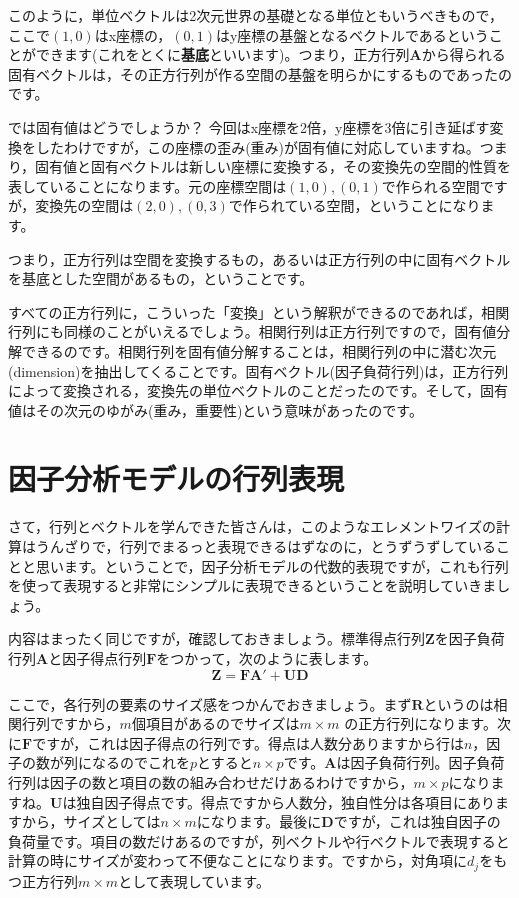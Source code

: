 \documentclass{ltjsbook}
\begin{document}
このように，単位ベクトルは2次元世界の基礎となる単位ともいうべきもので，ここで$(1,0)$はx座標の，$(0,1)$はy座標の基盤となるベクトルであるということができます(これをとくに\textbf{基底}といいます)。つまり，正方行列$\bm{A}$から得られる固有ベクトルは，その正方行列が作る空間の基盤を明らかにするものであったのです。

では固有値はどうでしょうか？ 今回はx座標を2倍，y座標を3倍に引き延ばす変換をしたわけですが，この座標の歪み(重み)が固有値に対応していますね。つまり，固有値と固有ベクトルは新しい座標に変換する，その変換先の空間的性質を表していることになります。元の座標空間は$(1,0),(0,1)$で作られる空間ですが，変換先の空間は$(2,0),(0,3)$で作られている空間，ということになります。

つまり，正方行列は空間を変換するもの，あるいは正方行列の中に固有ベクトルを基底とした空間があるもの，ということです。

すべての正方行列に，こういった「変換」という解釈ができるのであれば，相関行列にも同様のことがいえるでしょう。相関行列は正方行列ですので，固有値分解できるのです。相関行列を固有値分解することは，相関行列の中に潜む次元(dimension)を抽出してくることです。固有ベクトル(因子負荷行列)は，正方行列によって変換される，変換先の単位ベクトルのことだったのです。そして，固有値はその次元のゆがみ(重み，重要性)という意味があったのです。


\section{ 因子分析モデルの行列表現}
さて，行列とベクトルを学んできた皆さんは，このようなエレメントワイズの計算はうんざりで，行列でまるっと表現できるはずなのに，とうずうずしていることと思います。ということで，因子分析モデルの代数的表現ですが，これも行列を使って表現すると非常にシンプルに表現できるということを説明していきましょう。

内容はまったく同じですが，確認しておきましょう。標準得点行列$\bm{Z}$を因子負荷行列$\bm{A}$と因子得点行列$\bm{F}$をつかって，次のように表します。
\begin{equation}
    \bm{Z} = \bm{F} \bm{A} ' + \bm{U} \bm{D}
\end{equation}

ここで，各行列の要素のサイズ感をつかんでおきましょう。まず$\bm{R}$というのは相関行列ですから，$m$個項目があるのでサイズは$m \times m$ の正方行列になります。次に$\bm{F}$ですが，これは因子得点の行列です。得点は人数分ありますから行は$n$，因子の数が列になるのでこれを$p$とすると$n\times p$です。$\bm{A}$は因子負荷行列。因子負荷行列は因子の数と項目の数の組み合わせだけあるわけですから，$m \times p$になりますね。$\bm{U}$は独自因子得点です。得点ですから人数分，独自性分は各項目にありますから，サイズとしては$n \times m$になります。最後に$\bm{D}$ですが，これは独自因子の負荷量です。項目の数だけあるのですが，列ベクトルや行ベクトルで表現すると計算の時にサイズが変わって不便なことになります。ですから，対角項に$d_j$をもつ正方行列$m \times m$として表現しています。
\end{document}
